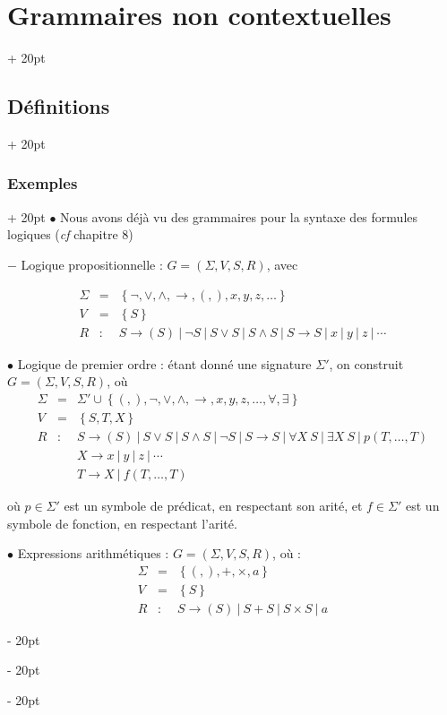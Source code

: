 \documentclass[a4paper, 12pt, twoside]{article}
\newcommand{\lr}[1]{\left( #1 \right)}
\newcommand{\set}[1]{\left\{ #1 \right\}}
\newcommand{\ind}[1][20pt]{\advance\leftskip + #1}
\newcommand{\deind}[1][20pt]{\advance\leftskip - #1}
\newenvironment{indt}[2][20pt]{#2 \par \ind[#1]}{\par \deind} %
\begin{document}
\begin{indt}{\section{Grammaires non contextuelles}}
\begin{indt}{\subsection{Définitions}}
\begin{indt}{\subsubsection{Exemples}}
                $\bullet$ Nous avons déjà vu des grammaires pour la syntaxe des formules logiques (\textit{cf} chapitre 8)

                $-$ Logique propositionnelle : $G = \lr{\Sigma, V, S, R}$, avec

                \[
                    \begin{array}{rcl}
                        \Sigma &=& \set{\neg, \vee, \wedge, \rightarrow, (, ), x, y, z, \ldots}
                        \\
                        V &=& \set S
                        \\
                        R &:& S \rightarrow (S) \ |\ \neg S \ |\ S \vee S \ |\ S \wedge S \ |\ S \rightarrow S \ |\ x \ |\ y \ |\ z \ |\ \cdots
                    \end{array}
                \]

                \vspace{12pt}
                
                $\bullet$ Logique de premier ordre : étant donné une signature $\Sigma'$, on construit $G = \lr{\Sigma, V, S, R}$, où
                \[
                    \begin{array}{rcl}
                        \Sigma &=& \Sigma' \cup \set{(, ), \neg, \vee, \wedge, \rightarrow, x, y, z, \ldots, \forall, \exists}
                        \\
                        V &=& \set{S, T, X}
                        \\
                        R &:& S \rightarrow (S) \ |\ S \vee S \ |\ S \wedge S \ |\ \neg S \ |\ S \rightarrow S \ |\ \forall X\ S \ |\ \exists X \ S \ |\ p(T, \ldots, T)
                        \\
                          && X \rightarrow x \ |\ y \ |\ z \ |\ \cdots
                        \\
                          && T \rightarrow X \ |\ f(T, \ldots, T)
                    \end{array}
                \]

                où $p \in \Sigma'$ est un symbole de prédicat, en respectant son arité, et $f \in \Sigma'$ est un symbole de fonction, en respectant l'arité.

                \vspace{12pt}
                
                $\bullet$ Expressions arithmétiques : $G = \lr{\Sigma, V, S, R}$, où :
                \[
                    \begin{array}{rcl}
                        \Sigma &=& \set{(, ), +, \times, a}
                        \\
                        V &=& \set{S}
                        \\
                        R &:& S \rightarrow (S) \ |\ S + S \ |\ S \times S \ |\ a
                    \end{array}
                \]
            \end{indt}


\end{indt}
\end{indt}
\end{document}
